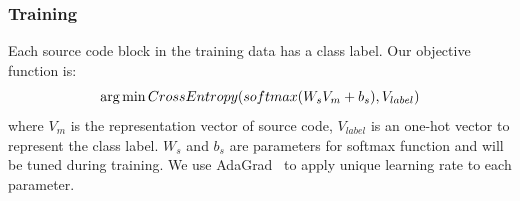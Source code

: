 \subsubsection{Training}
Each source code block in the training data has a class label.
Our objective function is:
\begin{equation}
\small{
\mathop{\arg\min} CrossEntropy(softmax(W_{s}V_{m} + b_{s}),V_{label})\label{eq:object}
}
\end{equation}
where $V_{m}$ is the representation vector of source code, $V_{label}$ is
an one-hot vector to represent the class label.
$W_{s}$ and $b_{s}$ are parameters for softmax function and will be
tuned during training.  We use AdaGrad~\cite{duchi2011adaptive} to apply
unique learning rate to each parameter.

%

%
%


